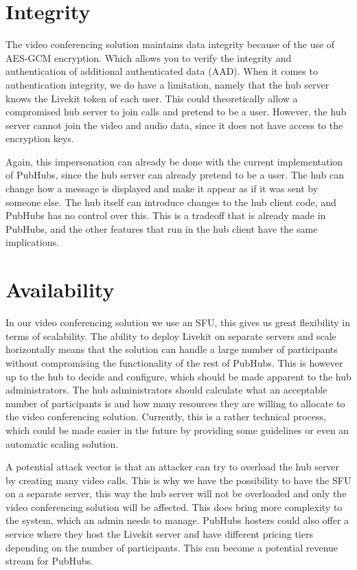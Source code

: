 \documentclass{report}
\begin{document}
\section{Integrity}
The video conferencing solution maintains data integrity because of the use of AES-GCM encryption. Which allows you
to verify the integrity and authentication of additional authenticated data (AAD). When it comes to authentication
integrity, we do have a limitation, namely that the hub server knows the Livekit token of each user. This could
theoretically allow a compromised hub server to join calls and pretend to be a user. However, the hub server cannot
join the video and audio data, since it does not have access to the encryption keys.

Again, this impersonation can already be done with the current implementation of PubHubs, since the hub server can
already pretend to be a user. The hub can change how a message is displayed and make it appear as if it was sent by
someone else. The hub itself can introduce changes to the hub client code, and PubHubs has no control over this.
This is a tradeoff that is already made in PubHubs, and the other features that run in the hub client have the same
implications.

\section{Availability}
In our video conferencing solution we use an SFU, this gives us great flexibility in terms of scalability. The
ability to deploy Livekit on separate servers and scale horizontally means that the solution can handle a large
number of participants without compromising the functionality of the rest of PubHubs. This is however up to the hub
to decide and configure, which should be made apparent to the hub administrators. The hub administrators should
calculate what an acceptable number of participants is and how many resources they are willing to allocate to the
video conferencing solution. Currently, this is a rather technical process, which could be made easier in the future
by providing some guidelines or even an automatic scaling solution.

A potential attack vector is that an attacker can try to overload the hub server by creating many video calls. This
is why we have the possibility to have the SFU on a separate server, this way the hub server will not be overloaded
and only the video conferencing solution will be affected. This does bring more complexity to the system, which an
admin needs to manage. PubHubs hosters could also offer a service where they host the Livekit server and have different
pricing tiers depending on the number of participants. This can become a potential revenue stream for PubHubs.
\end{document}
